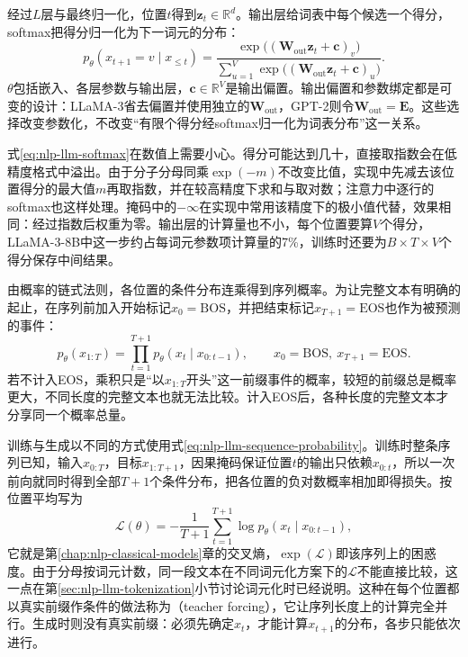 经过$L$层与最终归一化，位置$t$得到$\bm z_t\in\mathbb R^d$。输出层给词表中每个候选一个得分，softmax把得分归一化为下一词元的分布：
\begin{equation}
  p_\theta(x_{t+1}=v\mid x_{\leq t})=
  \frac{\exp\bigl((\bm W_{\mathrm{out}}\bm z_t+\bm c)_v\bigr)}
  {\sum_{u=1}^{V}\exp\bigl((\bm W_{\mathrm{out}}\bm z_t+\bm c)_u\bigr)}.
  \label{eq:nlp-llm-softmax}
\end{equation}
$\theta$包括嵌入、各层参数与输出层，$\bm c\in\mathbb R^V$是输出偏置。输出偏置和参数绑定都是可变的设计：LLaMA-3省去偏置并使用独立的$\bm W_{\mathrm{out}}$，GPT-2则令$\bm W_{\mathrm{out}}=\bm E$。这些选择改变参数化，不改变“有限个得分经softmax归一化为词表分布”这一关系。

式\eqref{eq:nlp-llm-softmax}在数值上需要小心。得分可能达到几十，直接取指数会在低精度格式中溢出。由于分子分母同乘$\exp(-m)$不改变比值，实现中先减去该位置得分的最大值$m$再取指数，并在较高精度下求和与取对数；注意力中逐行的softmax也这样处理。掩码中的$-\infty$在实现中常用该精度下的极小值代替，效果相同：经过指数后权重为零。输出层的计算量也不小，每个位置要算$V$个得分，LLaMA-3-8B中这一步约占每词元参数项计算量的7\%，训练时还要为$B\times T\times V$个得分保存中间结果。

由概率的链式法则，各位置的条件分布连乘得到序列概率。为让完整文本有明确的起止，在序列前加入开始标记$x_0=\mathrm{BOS}$，并把结束标记$x_{T+1}=\mathrm{EOS}$也作为被预测的事件：
\begin{equation}
  p_\theta(x_{1:T})=\prod_{t=1}^{T+1}p_\theta(x_t\mid x_{0:t-1}),
  \qquad x_0=\mathrm{BOS},\ x_{T+1}=\mathrm{EOS}.
  \label{eq:nlp-llm-sequence-probability}
\end{equation}
若不计入EOS，乘积只是“以$x_{1:T}$开头”这一前缀事件的概率，较短的前缀总是概率更大，不同长度的完整文本也就无法比较。计入EOS后，各种长度的完整文本才分享同一个概率总量。

训练与生成以不同的方式使用式\eqref{eq:nlp-llm-sequence-probability}。训练时整条序列已知，输入$x_{0:T}$，目标$x_{1:T+1}$，因果掩码保证位置$t$的输出只依赖$x_{0:t}$，所以一次前向就同时得到全部$T+1$个条件分布，把各位置的负对数概率相加即得损失。按位置平均写为
\begin{equation}
  \mathcal L(\theta)=-\frac{1}{T+1}\sum_{t=1}^{T+1}\log p_\theta(x_t\mid x_{0:t-1}),
  \label{eq:nlp-llm-token-loss}
\end{equation}
它就是第\ref{chap:nlp-classical-models}章的交叉熵，$\exp(\mathcal L)$即该序列上的困惑度。由于分母按词元计数，同一段文本在不同词元化方案下的$\mathcal L$不能直接比较，这一点在第\ref{sec:nlp-llm-tokenization}小节讨论词元化时已经说明。这种在每个位置都以真实前缀作条件的做法称为（teacher forcing），它让序列长度上的计算完全并行。生成时则没有真实前缀：必须先确定$x_t$，才能计算$x_{t+1}$的分布，各步只能依次进行。

